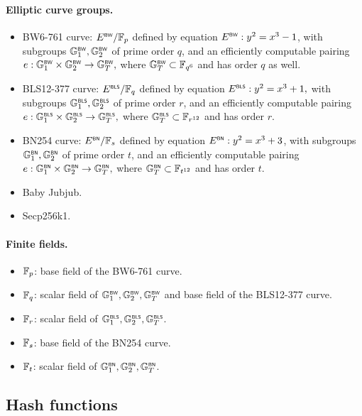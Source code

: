 \paragraph{Elliptic curve groups.}
\begin{itemize}
	\item BW6-761 curve: $\BW{E}/\F_p$ defined by equation $\BW{E}: y^2 = x^3 - 1$, with subgroups $\BW{\G}_1, \BW{\G}_2$ of prime order $q$, and an efficiently computable pairing \({e}:\BW{\G}_1\times\BW{\G}_2 \rightarrow \BW{\G}_T,\) where $\BW{\G}_T \subset \F_{q^{6}}$ and has order $q$ as well. 
    \item BLS12-377 curve: $\BLS{E}/\F_q$ defined by equation \(\BLS{E}: y^2 = x^3 + 1,\) with subgroups $\BLS{\G}_1, \BLS{\G}_2$ of prime order $r$, and an efficiently computable pairing \({e}:\BLS{\G}_1\times\BLS{\G}_2 \rightarrow \BLS{\G}_T,\) where $\BLS{\G}_T \subset \F_{r^{12}}$ and has order $r$. 
    \item BN254 curve: $\BN{E}/\F_s$ defined by equation \( \BN{E}: y^2 = x^3 + 3\), with subgroups $\BN{\G}_1, \BN{\G}_2$ of prime order $t$, and an efficiently computable pairing \(e:\BN{\G}_1\times\BN{\G}_2 \rightarrow \BN{\G}_T,\) where $\BN{\G}_T \subset \F_{t^{12}}$ and has order $t$. 
    \item Baby Jubjub.
    \item Secp256k1.
\end{itemize}

\paragraph{Finite fields.}
\begin{itemize}
	\item $\F_p$: base field of the BW6-761 curve.
	\item $\F_q$: scalar field of $\BW{\G}_1, \BW{\G}_2, \BW{\G}_T$ and base field of the BLS12-377 curve.
	\item $\F_r$: scalar field of $\BLS{\G}_1, \BLS{\G}_2, \BLS{\G}_T$.
	\item $\F_s$: base field of the BN254 curve.	
	\item $\F_t$: scalar field of $\BN{\G}_1, \BN{\G}_2, \BN{\G}_T$.
\end{itemize}


\subsection{Hash functions}
\label{sec:cryptographic-primitives:hash}

